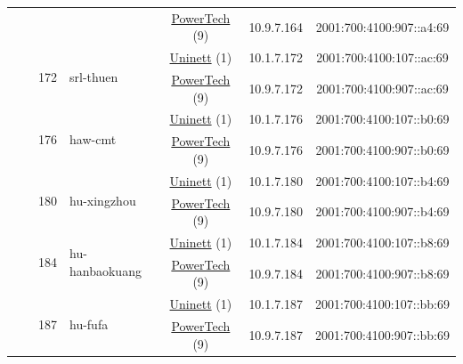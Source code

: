\begin{small}
\begin{center}
\begin{longtable}{|c|c|c|c|c|c|c|c|}
  &  &  &  & \multicolumn{2}{|c|}{\tiny{\href{http://www.powertech.no}{PowerTech} (9)}} & \tiny{10.9.7.164} & \tiny{2001:700:4100:907::a4:69} \\* \cline{3-3}\cline{4-4}\cline{5-5}\cline{6-6}\cline{7-7}\cline{8-8}
  &  & \multirow{2}{*}{\tiny{172}} & \multicolumn{1}{|l|}{\multirow{2}{*}{\tiny{srl-thuen}}} & \multicolumn{2}{|c|}{\tiny{\href{https://www.uninett.no}{Uninett} (1)}} & \tiny{10.1.7.172} & \tiny{2001:700:4100:107::ac:69} \\* \cline{5-5}\cline{6-6}\cline{7-7}\cline{8-8}
  &  &  &  & \multicolumn{2}{|c|}{\tiny{\href{http://www.powertech.no}{PowerTech} (9)}} & \tiny{10.9.7.172} & \tiny{2001:700:4100:907::ac:69} \\* \cline{3-3}\cline{4-4}\cline{5-5}\cline{6-6}\cline{7-7}\cline{8-8}
  &  & \multirow{2}{*}{\tiny{176}} & \multicolumn{1}{|l|}{\multirow{2}{*}{\tiny{haw-cmt}}} & \multicolumn{2}{|c|}{\tiny{\href{https://www.uninett.no}{Uninett} (1)}} & \tiny{10.1.7.176} & \tiny{2001:700:4100:107::b0:69} \\* \cline{5-5}\cline{6-6}\cline{7-7}\cline{8-8}
  &  &  &  & \multicolumn{2}{|c|}{\tiny{\href{http://www.powertech.no}{PowerTech} (9)}} & \tiny{10.9.7.176} & \tiny{2001:700:4100:907::b0:69} \\* \cline{3-3}\cline{4-4}\cline{5-5}\cline{6-6}\cline{7-7}\cline{8-8}
  &  & \multirow{2}{*}{\tiny{180}} & \multicolumn{1}{|l|}{\multirow{2}{*}{\tiny{hu-xingzhou}}} & \multicolumn{2}{|c|}{\tiny{\href{https://www.uninett.no}{Uninett} (1)}} & \tiny{10.1.7.180} & \tiny{2001:700:4100:107::b4:69} \\* \cline{5-5}\cline{6-6}\cline{7-7}\cline{8-8}
  &  &  &  & \multicolumn{2}{|c|}{\tiny{\href{http://www.powertech.no}{PowerTech} (9)}} & \tiny{10.9.7.180} & \tiny{2001:700:4100:907::b4:69} \\* \cline{3-3}\cline{4-4}\cline{5-5}\cline{6-6}\cline{7-7}\cline{8-8}
  &  & \multirow{2}{*}{\tiny{184}} & \multicolumn{1}{|l|}{\multirow{2}{*}{\tiny{hu-hanbaokuang}}} & \multicolumn{2}{|c|}{\tiny{\href{https://www.uninett.no}{Uninett} (1)}} & \tiny{10.1.7.184} & \tiny{2001:700:4100:107::b8:69} \\* \cline{5-5}\cline{6-6}\cline{7-7}\cline{8-8}
  &  &  &  & \multicolumn{2}{|c|}{\tiny{\href{http://www.powertech.no}{PowerTech} (9)}} & \tiny{10.9.7.184} & \tiny{2001:700:4100:907::b8:69} \\* \cline{3-3}\cline{4-4}\cline{5-5}\cline{6-6}\cline{7-7}\cline{8-8}
  &  & \multirow{2}{*}{\tiny{187}} & \multicolumn{1}{|l|}{\multirow{2}{*}{\tiny{hu-fufa}}} & \multicolumn{2}{|c|}{\tiny{\href{https://www.uninett.no}{Uninett} (1)}} & \tiny{10.1.7.187} & \tiny{2001:700:4100:107::bb:69} \\* \cline{5-5}\cline{6-6}\cline{7-7}\cline{8-8}
  &  &  &  & \multicolumn{2}{|c|}{\tiny{\href{http://www.powertech.no}{PowerTech} (9)}} & \tiny{10.9.7.187} & \tiny{2001:700:4100:907::bb:69} \\ \hline
\end{longtable}
\end{center}
\end{small}



